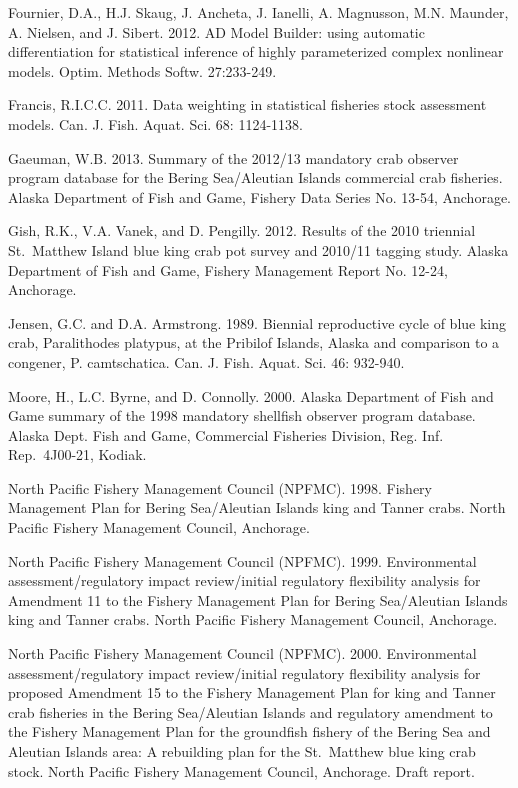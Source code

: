 \documentclass[]{article}
\begin{document}
Fournier, D.A., H.J. Skaug, J. Ancheta, J. Ianelli, A. Magnusson, M.N.
Maunder, A. Nielsen, and J. Sibert. 2012. AD Model Builder: using
automatic differentiation for statistical inference of highly
parameterized complex nonlinear models. Optim. Methods Softw.
27:233-249.

Francis, R.I.C.C. 2011. Data weighting in statistical fisheries stock
assessment models. Can. J. Fish. Aquat. Sci. 68: 1124-1138.

Gaeuman, W.B. 2013. Summary of the 2012/13 mandatory crab observer
program database for the Bering Sea/Aleutian Islands commercial crab
fisheries. Alaska Department of Fish and Game, Fishery Data Series No.
13-54, Anchorage.

Gish, R.K., V.A. Vanek, and D. Pengilly. 2012. Results of the 2010
triennial St.~Matthew Island blue king crab pot survey and 2010/11
tagging study. Alaska Department of Fish and Game, Fishery Management
Report No. 12-24, Anchorage.

Jensen, G.C. and D.A. Armstrong. 1989. Biennial reproductive cycle of
blue king crab, Paralithodes platypus, at the Pribilof Islands, Alaska
and comparison to a congener, P. camtschatica. Can. J. Fish. Aquat. Sci.
46: 932-940.

Moore, H., L.C. Byrne, and D. Connolly. 2000. Alaska Department of Fish
and Game summary of the 1998 mandatory shellfish observer program
database. Alaska Dept. Fish and Game, Commercial Fisheries Division,
Reg. Inf. Rep.~4J00-21, Kodiak.

North Pacific Fishery Management Council (NPFMC). 1998. Fishery
Management Plan for Bering Sea/Aleutian Islands king and Tanner crabs.
North Pacific Fishery Management Council, Anchorage.

North Pacific Fishery Management Council (NPFMC). 1999. Environmental
assessment/regulatory impact review/initial regulatory flexibility
analysis for Amendment 11 to the Fishery Management Plan for Bering
Sea/Aleutian Islands king and Tanner crabs. North Pacific Fishery
Management Council, Anchorage.

North Pacific Fishery Management Council (NPFMC). 2000. Environmental
assessment/regulatory impact review/initial regulatory flexibility
analysis for proposed Amendment 15 to the Fishery Management Plan for
king and Tanner crab fisheries in the Bering Sea/Aleutian Islands and
regulatory amendment to the Fishery Management Plan for the groundfish
fishery of the Bering Sea and Aleutian Islands area: A rebuilding plan
for the St.~Matthew blue king crab stock. North Pacific Fishery
Management Council, Anchorage. Draft report.
\end{document}
